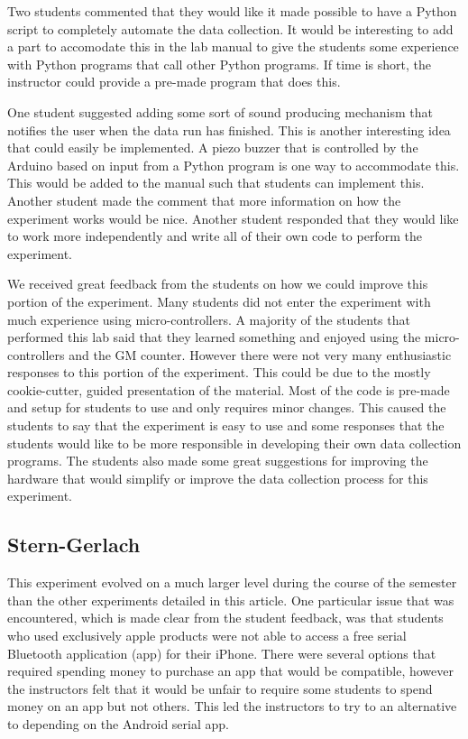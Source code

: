 Two students commented that they would like it made possible to have a Python script to completely automate the data collection.
It would be interesting to add a part to accomodate this in the lab manual to give the students some experience with Python programs that call other Python programs.
If time is short, the instructor could provide a pre-made program that does this.

One student suggested adding some sort of sound producing mechanism that notifies the user when the data run has finished.
This is another interesting idea that could easily be implemented.
A piezo buzzer that is controlled by the Arduino based on input from a Python program is one way to accommodate this.
This would be added to the manual such that students can implement this.
Another student made the comment that more information on how the experiment works would be nice.
Another student responded that they would like to work more independently and write all of their own code to perform the experiment.


We received great feedback from the students on how we could improve this portion of the experiment.
Many students did not enter the experiment with much experience using micro-controllers.
A majority of the students that performed this lab said that they learned something and enjoyed using the micro-controllers and the GM counter.
However there were not very many enthusiastic responses to this portion of the experiment.
This could be due to the mostly cookie-cutter, guided presentation of the material.
Most of the code is pre-made and setup for students to use and only requires minor changes.
This caused the students to say that the experiment is easy to use and some responses that the students would like to be more responsible in developing their own data collection programs.
The students also made some great suggestions for improving the hardware that would simplify or improve the data collection process for this experiment.

\subsection{Stern-Gerlach}
This experiment evolved on a much larger level during the course of the semester than the other experiments detailed in this article.
One particular issue that was encountered, which is made clear from the student feedback, was that students who used exclusively apple products were not able to access a free serial Bluetooth application (app) for their iPhone.
There were several options that required spending money to purchase an app that would be compatible, however the instructors felt that it would be unfair to require some students to spend money on an app but not others.
This led the instructors to try to an alternative to depending on the Android serial app.

